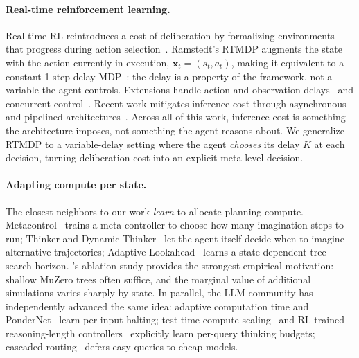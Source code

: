 \paragraph{Real-time reinforcement learning.}
Real-time RL reintroduces a cost of deliberation by formalizing environments
that progress during action selection~\citep{travnik2018reactive,
ramstedt2019rtrl}.
Ramstedt's RTMDP augments the state with the action currently in execution,
$\mathbf{x}_t = (s_t, a_t)$, making it equivalent to a constant 1-step
delay MDP~\citep{walsh2009delayed}: the delay is a property of the
framework, not a variable the agent controls.
Extensions handle action and observation delays~\citep{derman2021delayed,
bouteiller2021random,katsikopoulos2003markov} and concurrent
control~\citep{xiao2020thinking}.
Recent work mitigates inference cost through asynchronous and pipelined
architectures~\citep{riemer2025staggered,anokhin2025handling}.
Across all of this work, inference cost is something the architecture
imposes, not something the agent reasons about.
We generalize RTMDP to a variable-delay setting where the agent \emph{chooses}
its delay $K$ at each decision, turning deliberation cost into an explicit
meta-level decision.

\paragraph{Adapting compute per state.}
The closest neighbors to our work \emph{learn} to allocate planning compute.
Metacontrol~\citep{hamrick2017metacontrol} trains a meta-controller to choose
how many imagination steps to run; Thinker and Dynamic
Thinker~\citep{chung2023thinker,wang2024dynamic} let the agent itself decide
when to imagine alternative trajectories; Adaptive
Lookahead~\citep{dalal2022adaptive} learns a state-dependent tree-search
horizon.
\citet{hamrick2021role}'s ablation study provides the strongest empirical
motivation: shallow MuZero trees often suffice, and the marginal value of
additional simulations varies sharply by state.
In parallel, the LLM community has independently advanced the same idea:
adaptive computation time and PonderNet~\citep{graves2016act,banino2021pondernet,
schuster2022calm} learn per-input halting; test-time compute
scaling~\citep{snell2024scaling,deepseek2025r1,muennighoff2025s1} and
RL-trained reasoning-length controllers~\citep{aggarwal2025l1,
muppidi2025predictive,fang2025thinkless,shen2025dast} explicitly learn
per-query thinking budgets; cascaded routing~\citep{kim2023bigl,
chen2023frugalgpt,ong2025routellm} defers easy queries to cheap models.

